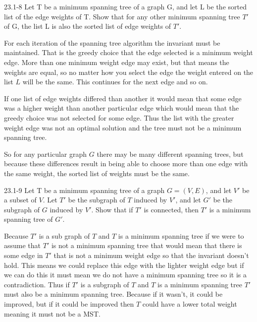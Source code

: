 \begin{problem}{23.1-8}
  Let T be a minimum spanning tree of a graph G, and let L be the sorted list of the edge weights of T. Show that for
  any other minimum spanning tree $T'$ of G, the list L is also the sorted list of edge weights of $T'$.
  \begin{solution}
    For each iteration of the spanning tree algorithm the invariant must be maintained. That is the greedy choice that
    the edge selected is a minimum weight edge.  More than one minimum weight edge may exist, but that means the weights
    are equal, so no matter how you select the edge the weight entered on the list $L$ will be the same. This continues
    for the next edge and so on.

    If one list of edge weights differed than another it would mean that some edge was a higher weight than another
    particular edge which would mean that the greedy choice was not selected for some edge. Thus the list with the
    greater weight edge was not an optimal solution and the tree must not be a minimum spanning tree.

    So for any particular graph $G$ there may be many different spanning trees, but because these differences result in
    being able to choose more than one edge with the same weight, the sorted list of weights must be the same.
  \end{solution}
\end{problem}

\begin{problem}{23.1-9}
  Let T be a minimum spanning tree of a graph $G = (V,E)$, and let $V'$ be a subset of $V$. Let $T'$ be the subgraph of
  $T$ induced by $V'$, and let $G'$ be the subgraph of $G$ induced by $V'$. Show that if $T'$ is connected, then $T'$ is
  a minimum spanning tree of $G'$.
  \begin{solution}
    Because $T'$ is a sub graph of $T$ and $T$ is a minimum spanning tree if we were to assume that $T'$ is not a
    minimum spanning tree that would mean that there is some edge in $T'$ that is not a minimum weight edge so that the
    invariant doesn't hold. This means we could replace this edge with the lighter weight edge but if we can do this it
    must mean we do not have a minimum spanning tree so it is a contradiction. Thus if $T'$ is a subgraph of $T$ and $T$
    is a minimum spanning tree $T'$ must also be a minimum spanning tree. Because if it wasn't, it could be improved,
    but if it could be improved then $T$ could have a lower total weight meaning it must not be a MST.
  \end{solution}
\end{problem}

